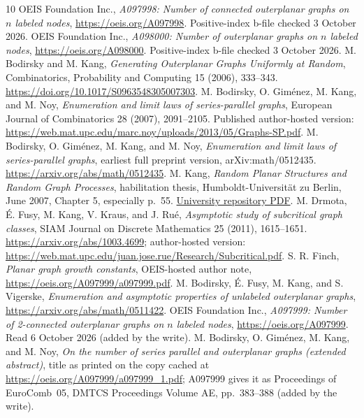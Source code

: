 \documentclass[11pt,letterpaper]{article}
\numberwithin{equation}{section}
\theoremstyle{remark}\newtheorem{remark}[theorem]{Remark}
\begin{document}
\clearpage
\begin{thebibliography}{10}
 OEIS Foundation Inc.,
\emph{A097998: Number of connected outerplanar graphs on $n$ labeled nodes},
\url{https://oeis.org/A097998}. Positive-index b-file checked 3 October 2026.
 OEIS Foundation Inc.,
\emph{A098000: Number of outerplanar graphs on $n$ labeled nodes},
\url{https://oeis.org/A098000}. Positive-index b-file checked 3 October 2026.
 M. Bodirsky and M. Kang,
\emph{Generating Outerplanar Graphs Uniformly at Random},
Combinatorics, Probability and Computing 15 (2006), 333--343.
\url{https://doi.org/10.1017/S0963548305007303}.
 M. Bodirsky, O. Gim\'enez, M. Kang, and M. Noy,
\emph{Enumeration and limit laws of series-parallel graphs},
European Journal of Combinatorics 28 (2007), 2091--2105.
Published author-hosted version:
\url{https://web.mat.upc.edu/marc.noy/uploads/2013/05/Graphs-SP.pdf}.
 M. Bodirsky, O. Gim\'enez, M. Kang, and M. Noy,
\emph{Enumeration and limit laws of series-parallel graphs},
earliest full preprint version, arXiv:math/0512435.
\url{https://arxiv.org/abs/math/0512435}.
 M. Kang,
\emph{Random Planar Structures and Random Graph Processes},
habilitation thesis, Humboldt-Universit\"at zu Berlin, June 2007,
Chapter 5, especially p.~55.
\href{https://edoc.hu-berlin.de/server/api/core/bitstreams/23f83814-f327-4458-9787-474e750b8262/content}{University repository PDF}.
 M. Drmota, \'E. Fusy, M. Kang, V. Kraus, and J. Ru\'e,
\emph{Asymptotic study of subcritical graph classes},
SIAM Journal on Discrete Mathematics 25 (2011), 1615--1651.
\url{https://arxiv.org/abs/1003.4699}; author-hosted version:
\url{https://web.mat.upc.edu/juan.jose.rue/Research/Subcritical.pdf}.
 S. R. Finch, \emph{Planar graph growth constants},
OEIS-hosted author note,
\url{https://oeis.org/A097999/a097999.pdf}.
 M. Bodirsky, \'E. Fusy, M. Kang, and S. Vigerske,
\emph{Enumeration and asymptotic properties of unlabeled outerplanar graphs},
\url{https://arxiv.org/abs/math/0511422}.
 OEIS Foundation Inc.,
\emph{A097999: Number of 2-connected outerplanar graphs on $n$ labeled nodes},
\url{https://oeis.org/A097999}. Read 6 October 2026 (added by the write).
 M. Bodirsky, O. Gim\'enez, M. Kang, and M. Noy,
\emph{On the number of series parallel and outerplanar graphs (extended
abstract)}, title as printed on the copy cached at
\url{https://oeis.org/A097999/a097999_1.pdf}; A097999 gives it as
Proceedings of EuroComb~05, DMTCS Proceedings Volume AE, pp.~383--388
(added by the write).
\end{thebibliography}
\end{document}
